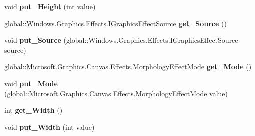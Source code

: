 \begin{DoxyCompactItemize}
void {\bfseries put\+\_\+\+Height} (int value)
\item 
\mbox{\label{interface_microsoft_1_1_graphics_1_1_canvas_1_1_effects_1_1_i_morphology_effect_ac0ce4230c50de3053b0200c3868607d6}} 
global\+::\+Windows.\+Graphics.\+Effects.\+I\+Graphics\+Effect\+Source {\bfseries get\+\_\+\+Source} ()
\item 
\mbox{\label{interface_microsoft_1_1_graphics_1_1_canvas_1_1_effects_1_1_i_morphology_effect_a6aba3568850c2df11ccf1005f5ecfbca}} 
void {\bfseries put\+\_\+\+Source} (global\+::\+Windows.\+Graphics.\+Effects.\+I\+Graphics\+Effect\+Source source)
\item 
\mbox{\label{interface_microsoft_1_1_graphics_1_1_canvas_1_1_effects_1_1_i_morphology_effect_a4625903e2e2033038f140f494007ccef}} 
global\+::\+Microsoft.\+Graphics.\+Canvas.\+Effects.\+Morphology\+Effect\+Mode {\bfseries get\+\_\+\+Mode} ()
\item 
\mbox{\label{interface_microsoft_1_1_graphics_1_1_canvas_1_1_effects_1_1_i_morphology_effect_ae67e959972393bca5d6e02aa06cd227b}} 
void {\bfseries put\+\_\+\+Mode} (global\+::\+Microsoft.\+Graphics.\+Canvas.\+Effects.\+Morphology\+Effect\+Mode value)
\item 
\mbox{\label{interface_microsoft_1_1_graphics_1_1_canvas_1_1_effects_1_1_i_morphology_effect_a30eb746728372b5fdd4c6e783b9a3545}} 
int {\bfseries get\+\_\+\+Width} ()
\item 
\mbox{\label{interface_microsoft_1_1_graphics_1_1_canvas_1_1_effects_1_1_i_morphology_effect_ac8928007cf4daceb6edf45df25104160}} 
void {\bfseries put\+\_\+\+Width} (int value)
\item 
\mbox{\label{interface_microsoft_1_1_graphics_1_1_canvas_1_1_effects_1_1_i_morphology_effect_a894c0a79c2bf5a0314930c5c502a7662}} 

\end{DoxyCompactItemize}
